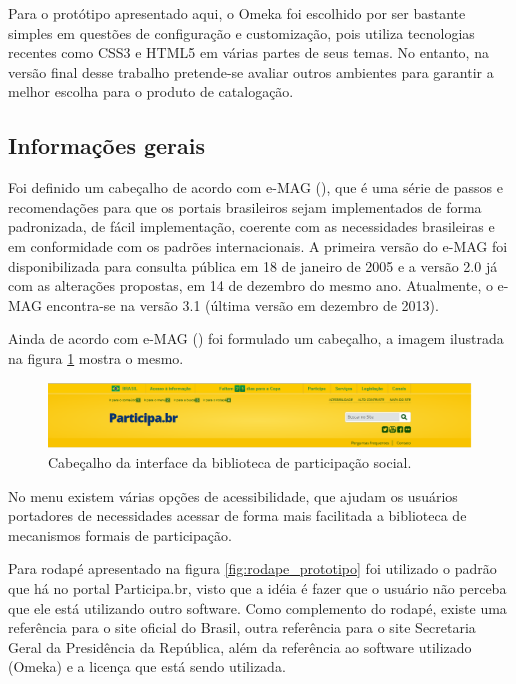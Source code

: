 Para o protótipo apresentado aqui, o Omeka foi escolhido por ser bastante simples em questões de configuração e customização, pois utiliza tecnologias recentes como CSS3 e HTML5 em várias partes de seus temas. No entanto, na versão final desse trabalho pretende-se avaliar outros ambientes para garantir a melhor escolha para o produto de catalogação. 

\subsection*{Informações gerais}

Foi definido um cabeçalho de acordo com e-MAG (\citeyear{emag2013usabilidade}), que é uma série de passos e recomendações para que os portais brasileiros sejam implementados de forma padronizada, de fácil implementação, coerente com as necessidades brasileiras e em conformidade com os padrões internacionais. A primeira versão do e-MAG foi disponibilizada para consulta pública em 18 de janeiro de 2005 e a versão 2.0 já com as alterações propostas, em 14 de dezembro do mesmo ano. Atualmente, o e-MAG encontra-se na versão 3.1 (última versão em dezembro de 2013). 

Ainda de acordo com e-MAG (\citeyear{emag2013usabilidade}) foi formulado um cabeçalho, a imagem ilustrada na figura \ref{fig:cab_prototipo} mostra o mesmo.

\graphicspath{{figuras/prototipo/}}
\begin{figure}[H]
\centering
\includegraphics[width=1.0\textwidth]{cabecalho}
\caption{Cabeçalho da interface da biblioteca de participação social.}
\label{fig:cab_prototipo}
\end{figure}

No menu existem várias opções de acessibilidade, que ajudam os usuários portadores de necessidades acessar de forma mais facilitada a biblioteca de mecanismos formais de participação.

Para rodapé apresentado na figura \ref{fig:rodape_prototipo} foi utilizado o padrão que há no portal Participa.br, visto que a idéia é fazer que o usuário não perceba que ele está utilizando outro software. Como complemento do rodapé, existe uma referência para o site oficial do Brasil, outra referência para o site Secretaria Geral da Presidência da República, além da referência ao software utilizado (Omeka) e a licença que está sendo utilizada.

